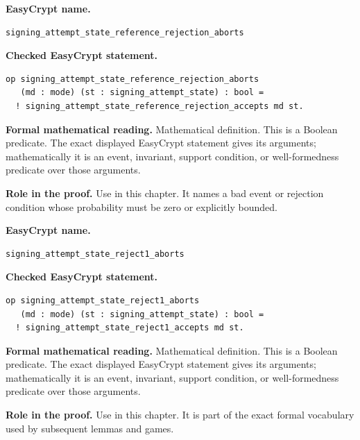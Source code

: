\begin{formaldefinition}
\noindent\textbf{EasyCrypt name.}
\begin{lstlisting}[language=EasyCrypt,basicstyle=\ttfamily\scriptsize]
signing_attempt_state_reference_rejection_aborts
\end{lstlisting}
\noindent\textbf{Checked EasyCrypt statement.}
\begin{lstlisting}[language=EasyCrypt,basicstyle=\ttfamily\scriptsize]
op signing_attempt_state_reference_rejection_aborts
   (md : mode) (st : signing_attempt_state) : bool =
  ! signing_attempt_state_reference_rejection_accepts md st.
\end{lstlisting}
\noindent\textbf{Formal mathematical reading.}
Mathematical definition. This is a Boolean predicate.  The exact displayed EasyCrypt statement gives its arguments; mathematically it is an event, invariant, support condition, or well-formedness predicate over those arguments.

\noindent\textbf{Role in the proof.}
Use in this chapter. It names a bad event or rejection condition whose probability must be zero or explicitly bounded.

\end{formaldefinition}

\begin{formaldefinition}
\noindent\textbf{EasyCrypt name.}
\begin{lstlisting}[language=EasyCrypt,basicstyle=\ttfamily\scriptsize]
signing_attempt_state_reject1_aborts
\end{lstlisting}
\noindent\textbf{Checked EasyCrypt statement.}
\begin{lstlisting}[language=EasyCrypt,basicstyle=\ttfamily\scriptsize]
op signing_attempt_state_reject1_aborts
   (md : mode) (st : signing_attempt_state) : bool =
  ! signing_attempt_state_reject1_accepts md st.
\end{lstlisting}
\noindent\textbf{Formal mathematical reading.}
Mathematical definition. This is a Boolean predicate.  The exact displayed EasyCrypt statement gives its arguments; mathematically it is an event, invariant, support condition, or well-formedness predicate over those arguments.

\noindent\textbf{Role in the proof.}
Use in this chapter. It is part of the exact formal vocabulary used by subsequent lemmas and games.

\end{formaldefinition}

